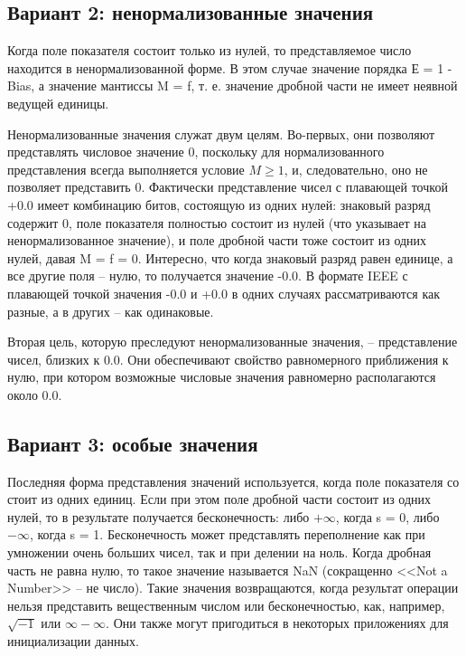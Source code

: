 \begin{center}
\end{center}

\subsection{Вариант 2: ненормализованные значения}

Когда поле показателя состоит только из нулей, то представляемое число находится
в ненормализованной форме. В этом случае значение порядка Е = 1 - Bias, а значение мантиссы M = f, т. е. значение дробной части не имеет неявной ведущей единицы.

Ненормализованные значения служат двум целям. Во-первых, они позволяют представлять числовое значение 0, поскольку для нормализованного представления всегда выполняется условие $M \geq 1$, и, следовательно, оно не позволяет представить 0. Фактически представление чисел с плавающей точкой +0.0 имеет комбинацию битов, состоящую из одних нулей: знаковый разряд содержит 0, поле показателя
полностью состоит из нулей (что указывает на ненормализованное значение), и поле дробной части тоже состоит из одних нулей, давая M = f = 0. Интересно, что когда знаковый разряд равен единице, а все другие поля – нулю, то получается значение -0.0. В формате IEEE с плавающей точкой значения -0.0 и +0.0 в одних случаях
рассматриваются как разные, а в других – как одинаковые.

Вторая цель, которую преследуют ненормализованные значения, – представление чисел, близких к 0.0. Они обеспечивают свойство равномерного приближения к нулю, при котором возможные числовые значения равномерно располагаются около 0.0.

\subsection{Вариант 3: особые значения}

Последняя форма представления значений используется, когда поле показателя со
стоит из одних единиц. Если при этом поле дробной части состоит из одних нулей, то в результате получается бесконечность: либо $+\infty$, когда s = 0, либо $-\infty$, когда s = 1. Бесконечность может представлять переполнение как при умножении очень больших чисел, так и при делении на ноль. Когда дробная часть не равна нулю, то такое значение называется NaN (сокращенно <<Not a Number>> – не число). Такие значения возвращаются, когда результат операции нельзя представить вещественным числом или бесконечностью, как, например, $\sqrt{-1}$ или $\infty - \infty$. Они также могут пригодиться в некоторых приложениях для инициализации данных.
